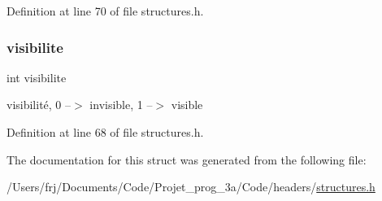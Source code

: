 Definition at line 70 of file structures.\+h.

\hypertarget{structtrace_aa34b47a3ed3a7dfed8a672132bcc3f2a}{}\label{structtrace_aa34b47a3ed3a7dfed8a672132bcc3f2a} 
\subsubsection{\texorpdfstring{visibilite}{visibilite}}
{\footnotesize\ttfamily int visibilite}

visibilité, 0 --$>$ invisible, 1 --$>$ visible 

Definition at line 68 of file structures.\+h.



The documentation for this struct was generated from the following file\+:\begin{DoxyCompactItemize}
\item 
/\+Users/frj/\+Documents/\+Code/\+Projet\+\_\+prog\+\_\+3a/\+Code/headers/\hyperlink{structures_8h}{structures.\+h}\end{DoxyCompactItemize}
